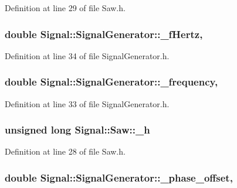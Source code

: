 Definition at line 29 of file Saw.\+h.

\hypertarget{classSignal_1_1SignalGenerator_a85a4702347352bab1c71e0a8df8437d6}{
\subsubsection[{\+\_\+f\+Hertz}]{\setlength{\rightskip}{0pt plus 5cm}double Signal\+::\+Signal\+Generator\+::\+\_\+f\+Hertz\hspace{0.3cm}{\ttfamily [protected]}, {\ttfamily [inherited]}}}\label{classSignal_1_1SignalGenerator_a85a4702347352bab1c71e0a8df8437d6}


Definition at line 34 of file Signal\+Generator.\+h.

\hypertarget{classSignal_1_1SignalGenerator_a7f107461333bce68c5dad412db96a8c2}{
\subsubsection[{\+\_\+frequency}]{\setlength{\rightskip}{0pt plus 5cm}double Signal\+::\+Signal\+Generator\+::\+\_\+frequency\hspace{0.3cm}{\ttfamily [protected]}, {\ttfamily [inherited]}}}\label{classSignal_1_1SignalGenerator_a7f107461333bce68c5dad412db96a8c2}


Definition at line 33 of file Signal\+Generator.\+h.

\hypertarget{classSignal_1_1Saw_a359bfaaab07a3c830da6b81baf045330}{
\subsubsection[{\+\_\+h}]{\setlength{\rightskip}{0pt plus 5cm}unsigned long Signal\+::\+Saw\+::\+\_\+h\hspace{0.3cm}{\ttfamily [protected]}}}\label{classSignal_1_1Saw_a359bfaaab07a3c830da6b81baf045330}


Definition at line 28 of file Saw.\+h.

\hypertarget{classSignal_1_1SignalGenerator_a6b4444d46747c8517171edbbf4b5588f}{
\subsubsection[{\+\_\+phase\+\_\+offset}]{\setlength{\rightskip}{0pt plus 5cm}double Signal\+::\+Signal\+Generator\+::\+\_\+phase\+\_\+offset\hspace{0.3cm}{\ttfamily [protected]}, {\ttfamily [inherited]}}}\label{classSignal_1_1SignalGenerator_a6b4444d46747c8517171edbbf4b5588f}


